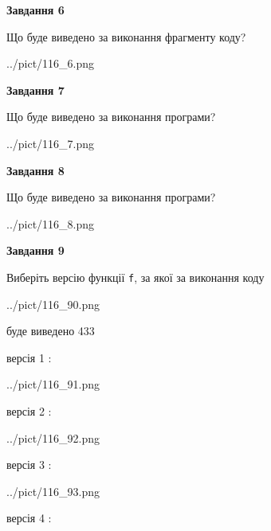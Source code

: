 \documentclass[12pt, ukrainian]{article}
\def\code#1{\Verb!#1!}
\begin{document}
{\begin {large}
{\begin {center}\textbf{Завдання 6}\end {center}}

Що буде виведено за виконання фрагменту коду?\par
\begin{center}
	{../pict/116_6.png}
\end{center}
\newpage

{\begin {center}\textbf{Завдання 7}\end {center}}

Що буде виведено за виконання програми?\par
\begin{center}
	{../pict/116_7.png}
\end{center}
\newpage

{\begin {center}\textbf{Завдання 8}\end {center}}

Що буде виведено за виконання програми?\par
\begin{center}
	{../pict/116_8.png}
\end{center}
\newpage

{\begin {center}\textbf{Завдання 9}\end {center}}

Виберіть версію функції \code{f}, за якої за виконання коду
\begin{center}
	{../pict/116_90.png}
\end{center}
буде виведено 433

\vspace{5mm}
версія 1 :

\begin{center}
	{../pict/116_91.png}
\end{center}
версія 2 :

\begin{center}
	{../pict/116_92.png}
\end{center}
версія 3 :

\begin{center}
	{../pict/116_93.png}
\end{center}
версія 4 :


\end{large}}
\end{document}
